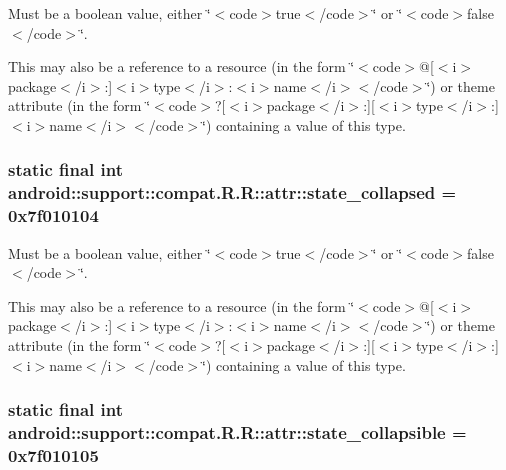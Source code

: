 Must be a boolean value, either \char`\"{}$<$code$>$true$<$/code$>$\char`\"{} or \char`\"{}$<$code$>$false$<$/code$>$\char`\"{}. 

This may also be a reference to a resource (in the form \char`\"{}$<$code$>$@\mbox{[}$<$i$>$package$<$/i$>$:\mbox{]}$<$i$>$type$<$/i$>$:$<$i$>$name$<$/i$>$$<$/code$>$\char`\"{}) or theme attribute (in the form \char`\"{}$<$code$>$?\mbox{[}$<$i$>$package$<$/i$>$:\mbox{]}\mbox{[}$<$i$>$type$<$/i$>$:\mbox{]}$<$i$>$name$<$/i$>$$<$/code$>$\char`\"{}) containing a value of this type. \hypertarget{classandroid_1_1support_1_1compat_1_1_r_1_1attr_dcdb511d1698aedbe602442b85fb1c55}{
\subsubsection[{state\_\-collapsed}]{\setlength{\rightskip}{0pt plus 5cm}static final int android::support::compat.R.R::attr::state\_\-collapsed = 0x7f010104}}
\label{classandroid_1_1support_1_1compat_1_1_r_1_1attr_dcdb511d1698aedbe602442b85fb1c55}


Must be a boolean value, either \char`\"{}$<$code$>$true$<$/code$>$\char`\"{} or \char`\"{}$<$code$>$false$<$/code$>$\char`\"{}. 

This may also be a reference to a resource (in the form \char`\"{}$<$code$>$@\mbox{[}$<$i$>$package$<$/i$>$:\mbox{]}$<$i$>$type$<$/i$>$:$<$i$>$name$<$/i$>$$<$/code$>$\char`\"{}) or theme attribute (in the form \char`\"{}$<$code$>$?\mbox{[}$<$i$>$package$<$/i$>$:\mbox{]}\mbox{[}$<$i$>$type$<$/i$>$:\mbox{]}$<$i$>$name$<$/i$>$$<$/code$>$\char`\"{}) containing a value of this type. \hypertarget{classandroid_1_1support_1_1compat_1_1_r_1_1attr_e8f0dabb842a087d177cd169cae5ba0d}{
\subsubsection[{state\_\-collapsible}]{\setlength{\rightskip}{0pt plus 5cm}static final int android::support::compat.R.R::attr::state\_\-collapsible = 0x7f010105}}
\label{classandroid_1_1support_1_1compat_1_1_r_1_1attr_e8f0dabb842a087d177cd169cae5ba0d}


